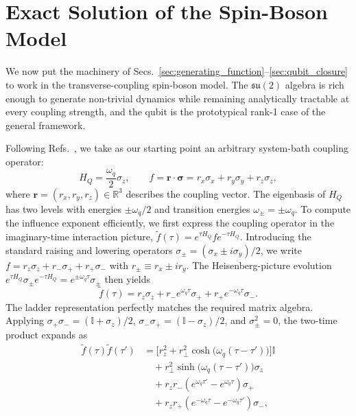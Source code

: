 ﻿%
\section{Exact Solution of the Spin-Boson Model}
\label{sec:qubit_direct_response_v5}

We now put the machinery of Secs.~\ref{sec:generating_function}--\ref{sec:qubit_closure} to work
in the transverse-coupling spin-boson model. The $\mathfrak{su}(2)$ algebra is rich enough
to generate non-trivial dynamics while remaining analytically tractable at every coupling strength,
and the qubit is the prototypical rank-1 case of the general framework.

Following Refs.~\cite{cresserWeakUltrastrongCoupling2021a,hovhannisyanHamiltonianMeanForce2020}, we take as our starting point an arbitrary system-bath coupling operator:
\begin{equation}
    H_Q=\frac{\omega_q}{2}\sigma_z,\qquad f = \boldsymbol{r} \cdot \boldsymbol{\sigma} = r_x\sigma_x + r_y\sigma_y + r_z\sigma_z,
    \label{eq:qubit_setup_closure}
\end{equation}
where $\boldsymbol{r} = (r_x, r_y, r_z) \in \mathbb{R}^3$ describes the coupling vector. The eigenbasis of $H_Q$ has two levels with energies $\pm\omega_q/2$ and transition energies $\omega_{\pm}=\pm\omega_q$. 
To compute the influence exponent efficiently, we first express the coupling operator in the imaginary-time interaction picture, $\tilde{f}(\tau) = e^{\tau H_Q} f e^{-\tau H_Q}$. Introducing the standard raising and lowering operators $\sigma_\pm = (\sigma_x \pm i\sigma_y)/2$, we write $f = r_z\sigma_z + r_-\sigma_+ + r_+\sigma_-$ with $r_\pm \equiv r_x \pm ir_y$. The Heisenberg-picture evolution $e^{\tau H_Q}\sigma_\pm e^{-\tau H_Q} = e^{\pm\omega_q\tau}\sigma_\pm$ then yields
\begin{equation}
    \tilde{f}(\tau) = r_z\sigma_z + r_- e^{\omega_q\tau}\sigma_+ + r_+ e^{-\omega_q\tau}\sigma_-.
    \label{eq:ftilde_tau}
\end{equation}
The ladder representation perfectly matches the required matrix algebra. Applying $\sigma_+\sigma_- = (\mathbb{I}+\sigma_z)/2$, $\sigma_-\sigma_+ = (\mathbb{I}-\sigma_z)/2$, and $\sigma_\pm^2 = 0$, the two-time product expands as
\begin{equation}
\begin{split}
    \tilde{f}(\tau)\tilde{f}(\tau')
    &= \Big[ r_z^2 + r_\perp^2 \cosh\!\big(\omega_q(\tau-\tau')\big) \Big] \mathbb{I} \\
    &\quad + r_\perp^2 \sinh\!\big(\omega_q(\tau-\tau')\big) \sigma_z \\
    &\quad + r_z r_- \!\left(e^{\omega_q\tau'} - e^{\omega_q\tau}\right) \sigma_+ \\
    &\quad + r_z r_+ \!\left(e^{-\omega_q\tau} - e^{-\omega_q\tau'}\right) \sigma_-,
\end{split}
\label{eq:ff_product}
\end{equation}
